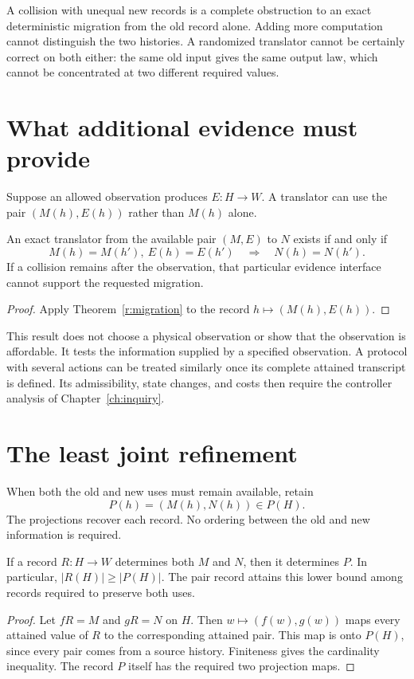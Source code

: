 A collision with unequal new records is a complete obstruction to an exact deterministic migration from the old record alone. Adding more computation cannot distinguish the two histories. A randomized translator cannot be certainly correct on both either: the same old input gives the same output law, which cannot be concentrated at two different required values.

\section{What additional evidence must provide}
Suppose an allowed observation produces $E:H\to W$. A translator can use the pair $(M(h),E(h))$ rather than $M(h)$ alone.

\begin{corollary}\label{r:migration-evidence}
An exact translator from the available pair $(M,E)$ to $N$ exists if and only if
\[
 M(h)=M(h'),\ E(h)=E(h')\quad\Longrightarrow\quad N(h)=N(h').
\]
If a collision remains after the observation, that particular evidence interface cannot support the requested migration.
\end{corollary}
\begin{proof}
Apply Theorem~\ref{r:migration} to the record $h\mapsto(M(h),E(h))$.
\end{proof}

This result does not choose a physical observation or show that the observation is affordable. It tests the information supplied by a specified observation. A protocol with several actions can be treated similarly once its complete attained transcript is defined. Its admissibility, state changes, and costs then require the controller analysis of Chapter~\ref{ch:inquiry}.

\section{The least joint refinement}
When both the old and new uses must remain available, retain
\[
 P(h)=(M(h),N(h))\in P(H).
\]
The projections recover each record. No ordering between the old and new information is required.

\begin{proposition}\label{r:joint-refinement-record}
If a record $R:H\to W$ determines both $M$ and $N$, then it determines $P$. In particular, $|R(H)|\ge |P(H)|$. The pair record attains this lower bound among records required to preserve both uses.
\end{proposition}
\begin{proof}
Let $fR=M$ and $gR=N$ on $H$. Then $w\mapsto(f(w),g(w))$ maps every attained value of $R$ to the corresponding attained pair. This map is onto $P(H)$, since every pair comes from a source history. Finiteness gives the cardinality inequality. The record $P$ itself has the required two projection maps.
\end{proof}

